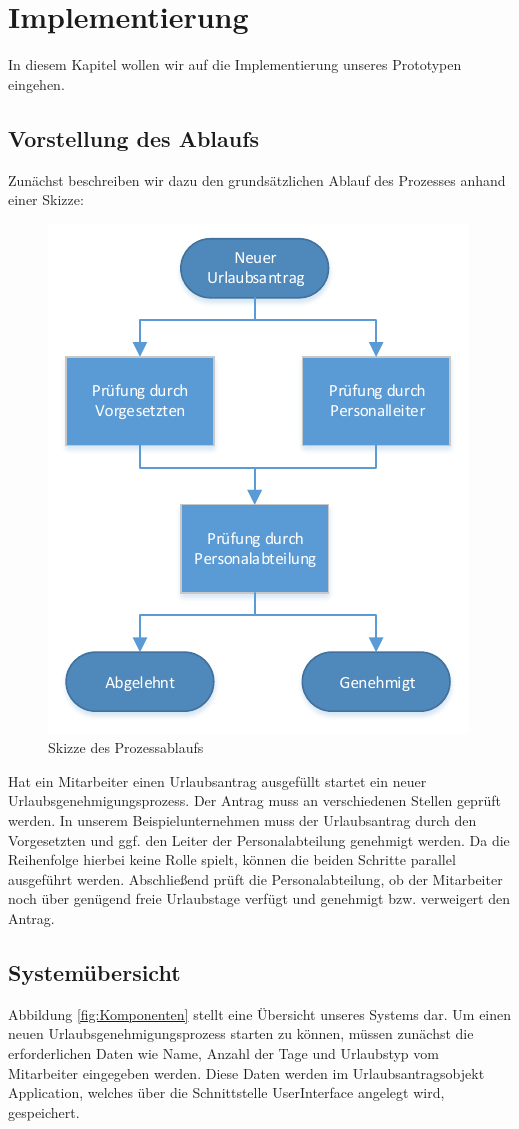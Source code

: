 \section{Implementierung}
In diesem Kapitel wollen wir auf die Implementierung unseres Prototypen eingehen.


\subsection{Vorstellung des Ablaufs}
Zunächst beschreiben wir dazu den grundsätzlichen Ablauf des Prozesses anhand einer Skizze:
\begin{figure}[H]
\centering
\includegraphics[width=0.5\linewidth]{Bilder/Workflow}
\caption{Skizze des Prozessablaufs}
\label{fig:Workflow}
\end{figure}

Hat ein Mitarbeiter einen Urlaubsantrag ausgefüllt startet ein neuer Urlaubsgenehmigungsprozess. Der Antrag muss an verschiedenen Stellen geprüft werden. In unserem Beispielunternehmen muss der Urlaubsantrag durch den Vorgesetzten und ggf. den Leiter der Personalabteilung genehmigt werden. Da die Reihenfolge hierbei keine Rolle spielt, können die beiden Schritte parallel ausgeführt werden. Abschließend prüft die Personalabteilung, ob der Mitarbeiter noch über genügend freie Urlaubstage verfügt und genehmigt bzw. verweigert den Antrag.	
	
	
\subsection{Systemübersicht}
Abbildung \ref{fig:Komponenten} stellt eine Übersicht unseres Systems dar. Um einen neuen Urlaubsgenehmigungsprozess starten zu können, müssen zunächst die erforderlichen Daten wie Name, Anzahl der Tage und Urlaubstyp vom Mitarbeiter eingegeben werden. Diese Daten werden im Urlaubsantragsobjekt Application, welches über die Schnittstelle UserInterface angelegt wird, gespeichert.

